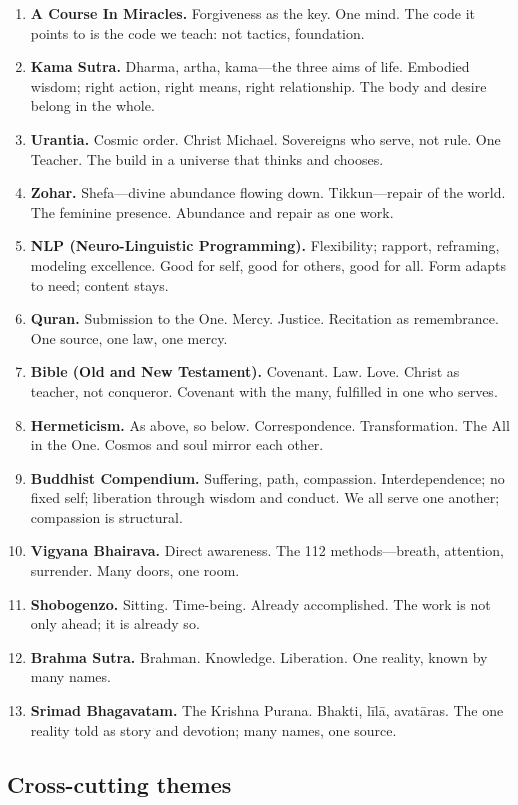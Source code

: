 \begin{enumerate}
\item \textbf{A Course In Miracles.} Forgiveness as the key. One mind. The code it points to is the code we teach: not tactics, foundation.
\item \textbf{Kama Sutra.} Dharma, artha, kama—the three aims of life. Embodied wisdom; right action, right means, right relationship. The body and desire belong in the whole.
\item \textbf{Urantia.} Cosmic order. Christ Michael. Sovereigns who serve, not rule. One Teacher. The build in a universe that thinks and chooses.
\item \textbf{Zohar.} Shefa—divine abundance flowing down. Tikkun—repair of the world. The feminine presence. Abundance and repair as one work.
\item \textbf{NLP (Neuro-Linguistic Programming).} Flexibility; rapport, reframing, modeling excellence. Good for self, good for others, good for all. Form adapts to need; content stays.
\item \textbf{Quran.} Submission to the One. Mercy. Justice. Recitation as remembrance. One source, one law, one mercy.
\item \textbf{Bible (Old and New Testament).} Covenant. Law. Love. Christ as teacher, not conqueror. Covenant with the many, fulfilled in one who serves.
\item \textbf{Hermeticism.} As above, so below. Correspondence. Transformation. The All in the One. Cosmos and soul mirror each other.
\item \textbf{Buddhist Compendium.} Suffering, path, compassion. Interdependence; no fixed self; liberation through wisdom and conduct. We all serve one another; compassion is structural.
\item \textbf{Vigyana Bhairava.} Direct awareness. The 112 methods—breath, attention, surrender. Many doors, one room.
\item \textbf{Shobogenzo.} Sitting. Time-being. Already accomplished. The work is not only ahead; it is already so.
\item \textbf{Brahma Sutra.} Brahman. Knowledge. Liberation. One reality, known by many names.
\item \textbf{Srimad Bhagavatam.} The Krishna Purana. Bhakti, līlā, avatāras. The one reality told as story and devotion; many names, one source.
\end{enumerate}

\subsection*{Cross-cutting themes}

